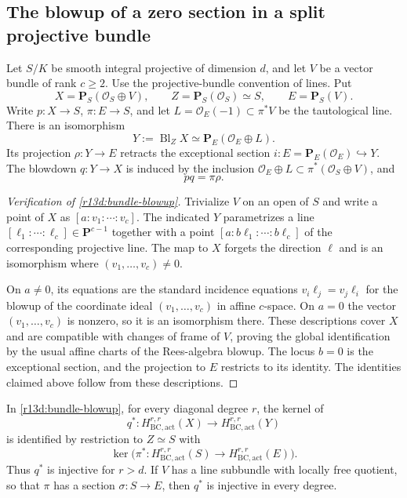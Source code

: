 \subsection{The blowup of a zero section in a split projective bundle}

Let $S/K$ be smooth integral projective of dimension $d$, and let
$V$ be a vector bundle of rank $c\geq2$.  Use the projective-bundle
convention of lines.  Put
\[
 X=\mathbf P_S(\mathcal O_S\oplus V),\qquad
 Z=\mathbf P_S(\mathcal O_S)\simeq S,
 \qquad
 E=\mathbf P_S(V).
\]
Write $p:X\to S$, $\pi:E\to S$, and let
$L=\mathcal O_E(-1)\subset\pi^*V$ be the tautological line.  There
is an isomorphism
\[
       Y:=\operatorname{Bl}_{Z}X
          \simeq\mathbf P_E(\mathcal O_E\oplus L).
\tag{R13.D8}\label{r13d:bundle-blowup}
\]
Its projection $\rho:Y\to E$ retracts the exceptional section
$i:E=\mathbf P_E(\mathcal O_E)\hookrightarrow Y$.  The blowdown
$q:Y\to X$ is induced by the inclusion
$\mathcal O_E\oplus L\subset\pi^*(\mathcal O_S\oplus V)$, and
\[
                            pq=\pi\rho.
\tag{R13.D9}\label{r13d:bundle-square}
\]

\begin{proof}[Verification of \eqref{r13d:bundle-blowup}]
Trivialize $V$ on an open of $S$ and write a point of $X$ as
$[a:v_1:\cdots:v_c]$.  The indicated $Y$ parametrizes a line
$[\ell_1:\cdots:\ell_c]\in\mathbf P^{c-1}$ together with a point
$[a:b\ell_1:\cdots:b\ell_c]$ of the corresponding projective line.
The map to $X$ forgets the direction $\ell$ and is an isomorphism
where $(v_1,\ldots,v_c)\ne0$.

On $a\ne0$, its equations are the standard incidence equations
$v_i\ell_j=v_j\ell_i$ for the blowup of the coordinate ideal
$(v_1,\ldots,v_c)$ in affine $c$-space.  On $a=0$ the vector
$(v_1,\ldots,v_c)$ is nonzero, so it is an isomorphism there.  These
descriptions cover $X$ and are compatible with changes of frame of
$V$, proving the global identification by the usual affine charts
of the Rees-algebra blowup.  The locus $b=0$ is the exceptional
section, and the projection to $E$ restricts to its identity.
The identities claimed above follow from these descriptions.
\end{proof}

\begin{theorem}
\label{r13d:split-kernel}
In \eqref{r13d:bundle-blowup}, for every diagonal degree $r$, the
kernel of
\[
                  q^*:H_{\mathrm{BC,act}}^{r,r}(X)
                                  \to H_{\mathrm{BC,act}}^{r,r}(Y)
\]
is identified by restriction to $Z\simeq S$ with
\[
                  \ker\bigl(\pi^*:H_{\mathrm{BC,act}}^{r,r}(S)
                                    \to H_{\mathrm{BC,act}}^{r,r}(E)\bigr).
\tag{R13.D10}\label{r13d:kernel-base}
\]
Thus $q^*$ is injective for $r>d$.  If $V$ has a line subbundle
with locally free quotient, so that $\pi$ has a section
$\sigma:S\to E$, then $q^*$ is injective in every degree.
\end{theorem}

